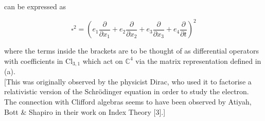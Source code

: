 \documentclass[10pt, letterpaper]{article}
\begin{document}
can be expressed as

$$
\square^{2}=\left(e_{1} \frac{\partial}{\partial x_{1}}+e_{2} \frac{\partial}{\partial x_{2}}+e_{3} \frac{\partial}{\partial x_{3}}+e_{4} \frac{\partial}{\partial t}\right)^{2}
$$

where the terms inside the brackets are to be thought of as differential operators with coefficients in $\mathrm{Cl}_{3,1}$ which act on $\mathbb{C}^{4}$ via the matrix representation defined in (a).\\[0pt]
[This was originally observed by the physicist Dirac, who used it to factorise a relativistic version of the Schrödinger equation in order to study the electron. The connection with Clifford algebras seems to have been observed by Atiyah, Bott \& Shapiro in their work on Index Theory [3].]







\pagebreak
\printbibliography
\end{document}
